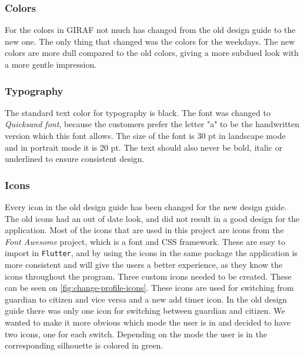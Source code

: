\subsubsection{Colors}
For the colors in GIRAF not much has changed from the old design guide to the new one. 
The only thing that changed was the colors for the weekdays.
The new colors are more dull compared to the old colors, giving a more subdued look with a more gentle impression.

\subsubsection{Typography}
The standard text color for typography is black.
The font was changed to \textit{Quicksand font}, because the customers prefer the letter "a" to be the handwritten version which this font allows.
The size of the font is 30 pt in landscape mode and in portrait mode it is 20 pt.
The text should also never be bold, italic or underlined to ensure consistent design.

\subsubsection{Icons}
Every icon in the old design guide has been changed for the new design guide.
The old icons had an out of date look, and did not result in a good design for the application.
Most of the icons that are used in this project are icons from the \textit{Font Awesome} project, which is a font and CSS framework.
These are easy to import in \texttt{Flutter}, and by using the icons in the same package the application is more consistent and will give the users a better experience, as they know the icons throughout the program.
Three custom icons needed to be created. 
These can be seen on \autoref{fig:change-profile-icons}. 
These icons are used for switching from guardian to citizen and vice versa and a new add timer icon.
In the old design guide there was only one icon for switching between guardian and citizen.
We wanted to make it more obvious which mode the user is in and decided to have two icons, one for each switch.
Depending on the mode the user is in the corresponding silhouette is colored in green.

